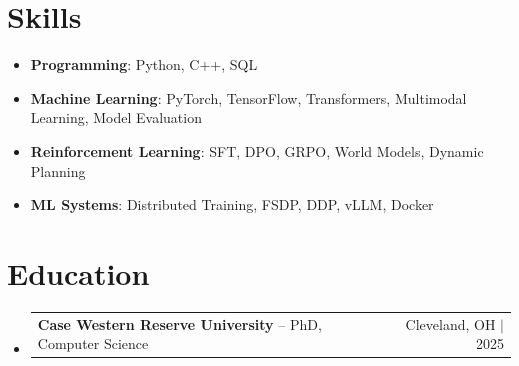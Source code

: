 \documentclass[letterpaper,13pt]{article}
\makeatletter
\newcommand{\resumeProjectHeading}[2]{
    \item
    \begin{tabular*}{\textwidth}{l@{\extracolsep{\fill}}r}
      \small#1 & #2 \\
    \end{tabular*}\vspace{-4pt}
}
\newcommand{\resumeSubHeadingListStart}{\begin{itemize}[leftmargin=0in, label={}]}
\newcommand{\resumeSubHeadingListEnd}{\end{itemize}}
\makeatother
\begin{document}
\section{Skills}
\vspace{0.02cm}
\begin{itemize}[leftmargin=0.15in, label={}, itemsep=2pt, topsep=1pt]
  \item \textbf{Programming}: Python, C++, SQL
  \item \textbf{Machine Learning}: PyTorch, TensorFlow, Transformers, Multimodal Learning, Model Evaluation
  \item \textbf{Reinforcement Learning}: SFT, DPO, GRPO, World Models, Dynamic Planning
  \item \textbf{ML Systems}: Distributed Training, FSDP, DDP, vLLM, Docker
\end{itemize}
\vspace{0.02cm}

\section{Education}
\resumeSubHeadingListStart
  \resumeProjectHeading{\textbf{Case Western Reserve University} -- PhD, Computer Science}{Cleveland, OH $|$ 2025}
\resumeSubHeadingListEnd
\end{document}
